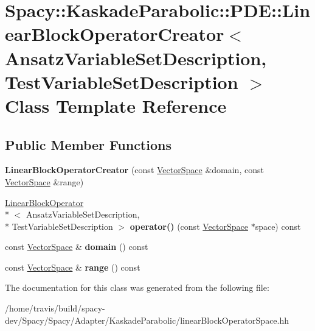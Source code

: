 \hypertarget{classSpacy_1_1KaskadeParabolic_1_1PDE_1_1LinearBlockOperatorCreator}{\section{Spacy\-:\-:Kaskade\-Parabolic\-:\-:P\-D\-E\-:\-:Linear\-Block\-Operator\-Creator$<$ Ansatz\-Variable\-Set\-Description, Test\-Variable\-Set\-Description $>$ Class Template Reference}
\label{classSpacy_1_1KaskadeParabolic_1_1PDE_1_1LinearBlockOperatorCreator}
}
\subsection*{Public Member Functions}
\begin{DoxyCompactItemize}
\item 
\hypertarget{classSpacy_1_1KaskadeParabolic_1_1PDE_1_1LinearBlockOperatorCreator_aaaad4a417fd82c517731b77704417760}{{\bfseries Linear\-Block\-Operator\-Creator} (const \hyperlink{classSpacy_1_1VectorSpace}{Vector\-Space} \&domain, const \hyperlink{classSpacy_1_1VectorSpace}{Vector\-Space} \&range)}\label{classSpacy_1_1KaskadeParabolic_1_1PDE_1_1LinearBlockOperatorCreator_aaaad4a417fd82c517731b77704417760}

\item 
\hypertarget{classSpacy_1_1KaskadeParabolic_1_1PDE_1_1LinearBlockOperatorCreator_ac894c38359f40dc32333fdda8ef71070}{\hyperlink{classSpacy_1_1KaskadeParabolic_1_1PDE_1_1LinearBlockOperator}{Linear\-Block\-Operator}\\*
$<$ Ansatz\-Variable\-Set\-Description, \\*
Test\-Variable\-Set\-Description $>$ {\bfseries operator()} (const \hyperlink{classSpacy_1_1VectorSpace}{Vector\-Space} $\ast$space) const }\label{classSpacy_1_1KaskadeParabolic_1_1PDE_1_1LinearBlockOperatorCreator_ac894c38359f40dc32333fdda8ef71070}

\item 
\hypertarget{classSpacy_1_1KaskadeParabolic_1_1PDE_1_1LinearBlockOperatorCreator_aad1526982771c4cdf7de775698742463}{const \hyperlink{classSpacy_1_1VectorSpace}{Vector\-Space} \& {\bfseries domain} () const }\label{classSpacy_1_1KaskadeParabolic_1_1PDE_1_1LinearBlockOperatorCreator_aad1526982771c4cdf7de775698742463}

\item 
\hypertarget{classSpacy_1_1KaskadeParabolic_1_1PDE_1_1LinearBlockOperatorCreator_ae70d0034fb04ed2b8a49099032e92b55}{const \hyperlink{classSpacy_1_1VectorSpace}{Vector\-Space} \& {\bfseries range} () const }\label{classSpacy_1_1KaskadeParabolic_1_1PDE_1_1LinearBlockOperatorCreator_ae70d0034fb04ed2b8a49099032e92b55}

\end{DoxyCompactItemize}


The documentation for this class was generated from the following file\-:\begin{DoxyCompactItemize}
\item 
/home/travis/build/spacy-\/dev/\-Spacy/\-Spacy/\-Adapter/\-Kaskade\-Parabolic/linear\-Block\-Operator\-Space.\-hh\end{DoxyCompactItemize}
